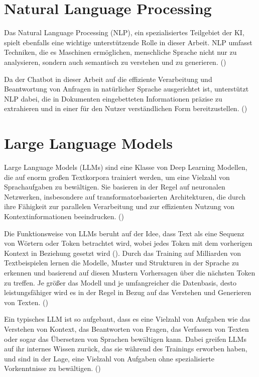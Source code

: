 \section{Natural Language Processing}

Das Natural Language Processing (\ac{NLP}), ein spezialisiertes Teilgebiet der \ac{KI}, spielt ebenfalls eine wichtige unterstützende Rolle in dieser Arbeit. 
\ac{NLP} umfasst Techniken, die es Maschinen ermöglichen, menschliche Sprache nicht nur zu analysieren, sondern auch semantisch zu verstehen und zu generieren. (\cite[S. 31]{trapp2021})

Da der Chatbot in dieser Arbeit auf die effiziente Verarbeitung und Beantwortung von Anfragen in natürlicher Sprache ausgerichtet ist, 
unterstützt \ac{NLP} dabei, die in Dokumenten eingebetteten Informationen präzise zu extrahieren und in einer für den Nutzer verständlichen Form bereitzustellen. (\cite[S. 30]{Raj2019})

\section{Large Language Models}

Large Language Models (\acp{LLM}) sind eine Klasse von Deep Learning Modellen, die auf enorm großen Textkorpora trainiert werden, um eine Vielzahl von Sprachaufgaben zu bewältigen. 
Sie basieren in der Regel auf neuronalen Netzwerken, insbesondere auf transformatorbasierten Architekturen, die durch ihre Fähigkeit zur parallelen Verarbeitung und zur effizienten Nutzung von Kontextinformationen beeindrucken. (\cite[S. 7]{naveed2024})

Die Funktionsweise von \acp{LLM} beruht auf der Idee, dass Text als eine Sequenz von Wörtern oder Token betrachtet wird, wobei jedes Token mit dem vorherigen Kontext in Beziehung gesetzt wird (\cite[S. 4]{naveed2024}). 
Durch das Training auf Milliarden von Textbeispielen lernen die Modelle, Muster und Strukturen in der Sprache zu erkennen und basierend auf diesen Mustern Vorhersagen über die nächsten Token zu treffen. 
Je größer das Modell und je umfangreicher die Datenbasis, desto leistungsfähiger wird es in der Regel in Bezug auf das Verstehen und Generieren von Texten. (\cite[S. 1 ff.]{mielke2021})

Ein typisches \ac{LLM} ist so aufgebaut, dass es eine Vielzahl von Aufgaben wie das Verstehen von Kontext, das Beantworten von Fragen, das Verfassen von Texten oder sogar das Übersetzen von Sprachen bewältigen kann. 
Dabei greifen \acp{LLM} auf ihr internes Wissen zurück, das sie während des Trainings erworben haben, und sind in der Lage, eine Vielzahl von Aufgaben ohne spezialisierte Vorkenntnisse zu bewältigen. (\cite[S. 7]{Cerf2023})

